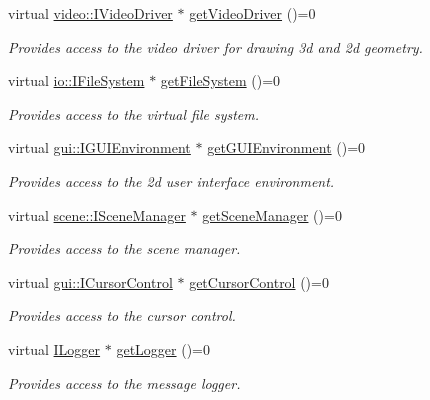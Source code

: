 \begin{DoxyCompactItemize}
virtual \hyperlink{classirr_1_1video_1_1IVideoDriver}{video\+::\+I\+Video\+Driver} $\ast$ \hyperlink{classirr_1_1IrrlichtDevice_ada90707ba5c645d47e000e4e0f87c4c4}{get\+Video\+Driver} ()=0
\begin{DoxyCompactList}\small\item\em Provides access to the video driver for drawing 3d and 2d geometry. \end{DoxyCompactList}\item 
virtual \hyperlink{classirr_1_1io_1_1IFileSystem}{io\+::\+I\+File\+System} $\ast$ \hyperlink{classirr_1_1IrrlichtDevice_a3d8d2dee2f57aa7e6c0d14592de3e6ed}{get\+File\+System} ()=0
\begin{DoxyCompactList}\small\item\em Provides access to the virtual file system. \end{DoxyCompactList}\item 
virtual \hyperlink{classirr_1_1gui_1_1IGUIEnvironment}{gui\+::\+I\+G\+U\+I\+Environment} $\ast$ \hyperlink{classirr_1_1IrrlichtDevice_af7491b8c5ef4f71360f30fbad90ae35c}{get\+G\+U\+I\+Environment} ()=0
\begin{DoxyCompactList}\small\item\em Provides access to the 2d user interface environment. \end{DoxyCompactList}\item 
virtual \hyperlink{classirr_1_1scene_1_1ISceneManager}{scene\+::\+I\+Scene\+Manager} $\ast$ \hyperlink{classirr_1_1IrrlichtDevice_a891b503ff4d5041296d88f23f97d7b3d}{get\+Scene\+Manager} ()=0
\begin{DoxyCompactList}\small\item\em Provides access to the scene manager. \end{DoxyCompactList}\item 
virtual \hyperlink{classirr_1_1gui_1_1ICursorControl}{gui\+::\+I\+Cursor\+Control} $\ast$ \hyperlink{classirr_1_1IrrlichtDevice_a500a3b7bf69487ff7e2075dd0b0db529}{get\+Cursor\+Control} ()=0
\begin{DoxyCompactList}\small\item\em Provides access to the cursor control. \end{DoxyCompactList}\item 
virtual \hyperlink{classirr_1_1ILogger}{I\+Logger} $\ast$ \hyperlink{classirr_1_1IrrlichtDevice_adec0b0b6b71b5066dd2c7039f1f4d85b}{get\+Logger} ()=0
\begin{DoxyCompactList}\small\item\em Provides access to the message logger. \end{DoxyCompactList}\item 

\end{DoxyCompactItemize}

